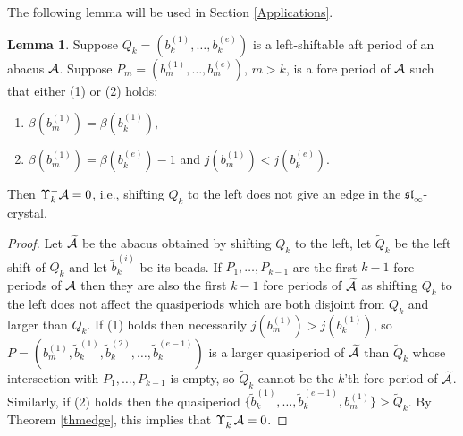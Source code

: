 \documentclass[12pt]{amsart}
\numberwithin{equation}{section}
\theoremstyle{definition}
\newtheorem{lemma}[equation]{Lemma}
\newcommand{\slinf}{\mathfrak{sl}_\infty}
\begin{document}
The following lemma will be used in Section \ref{Applications}.

\begin{lemma}\label{lemgesperrt}Suppose $Q_k=(b_k^{(1)},\dots,b_k^{(e)})$ is a left-shiftable aft period of an abacus $\mathcal{A}$. Suppose $P_m=(b_m^{(1)},\dots,b_m^{(e)})$, $m>k$, is a fore period of $\mathcal{A}$ such that either (1) or (2) holds:
\begin{enumerate}
\item $\beta(b_m^{(1)})=\beta(b_k^{(1)})$,
\item $\beta(b_m^{(1)})=\beta(b_k^{(e)})-1$ and $j(b_m^{(1)})<j(b_k^{(e)})$.
\end{enumerate}
Then $\Upsilon_k^-\mathcal{A}=0$, i.e., shifting $Q_k$ to the left does not give an edge in the $\slinf$-crystal.
\end{lemma}

\begin{proof}
Let $\widetilde{\mathcal{A}}$ be the abacus obtained by shifting $Q_k$ to the left, let $\tilde{Q}_k$ be the left shift of $Q_k$ and let $\tilde{b}_k^{(i)}$ be its beads. If $P_1,\dots,P_{k-1}$ are the first $k-1$ fore periods of $\mathcal{A}$ then they are also the first $k-1$ fore periods of $\widetilde{\mathcal{A}}$ as shifting $Q_k$ to the left does not affect the quasiperiods which are both disjoint from $Q_k$ and larger than $Q_k$. If (1) holds then necessarily $j(b_m^{(1)})>j(b_k^{(1)})$, so $P=(b_m^{(1)},\tilde{b}_k^{(1)},\tilde{b}_k^{(2)},\dots,\tilde{b}_k^{(e-1)})$ is a larger quasiperiod of $\widetilde{\mathcal{A}}$ than $\tilde{Q}_k$ whose intersection with $P_1,\dots,P_{k-1}$ is empty, so $\tilde{Q}_k$ cannot be the $k$'th fore period of $\widetilde{\mathcal{A}}$. Similarly, if (2) holds then the quasiperiod $\{\tilde{b}_k^{(1)},\dots,\tilde{b}_k^{(e-1)}, b_m^{(1)}\}>\tilde{Q}_k$. By Theorem \ref{thmedge}, this implies that $\Upsilon_k^-\mathcal{A}=0$. 
\end{proof}
\end{document}
